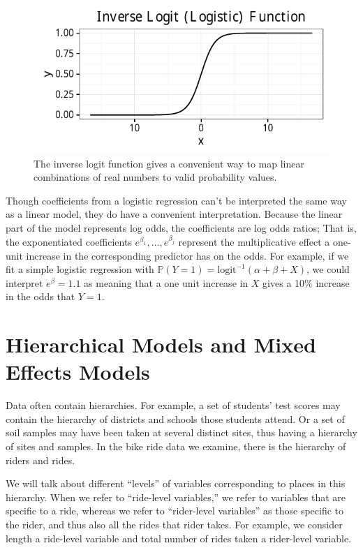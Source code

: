 \documentclass[12pt,twoside]{reedthesis}
\begin{document}
  \begin{figure}[tbh]
  \centering
  \includegraphics[angle = 0,scale = 1]{figure/logit_plot.pdf}
  \caption[The inverse logit function]{\normalsize{The inverse logit function gives a convenient way to map linear
  combinations of real numbers to valid probability values.}}
  \label{fig:logit-plot}
  \end{figure}
  
  Though coefficients from a logistic regression can't be interpreted the
  same way as a linear model, they do have a convenient interpretation.
  Because the linear part of the model represents log odds, the
  coefficients are log odds ratios; That is, the exponentiated
  coefficients \(e^{\beta_1}, \ldots, e^{\beta_j}\) represent the
  multiplicative effect a one-unit increase in the corresponding predictor
  has on the odds. For example, if we fit a simple logistic regression
  with \(\mathbb{P}(Y = 1) = \text{logit}^{-1} (\alpha + \beta + X)\), we
  could interpret \(e^{\beta} = 1.1\) as meaning that a one unit increase
  in \(X\) gives a 10\% increase in the odds that \(Y = 1\).
  
  \section{Hierarchical Models and Mixed Effects Models}\label{h-models}
  
  Data often contain hierarchies. For example, a set of students' test
  scores may contain the hierarchy of districts and schools those students
  attend. Or a set of soil samples may have been taken at several distinct
  sites, thus having a hierarchy of sites and samples. In the bike ride
  data we examine, there is the hierarchy of riders and rides.
  
  We will talk about different ``levels'' of variables corresponding to
  places in this hierarchy. When we refer to ``ride-level variables,'' we
  refer to variables that are specific to a ride, whereas we refer to
  ``rider-level variables'' as those specific to the rider, and thus also
  all the rides that rider takes. For example, we consider length a
  ride-level variable and total number of rides taken a rider-level
  variable.
  
\end{document}
